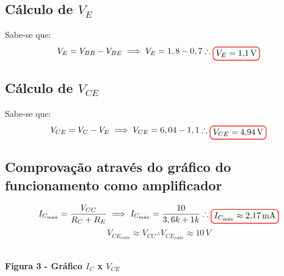 \documentclass[12pt,openany,oneside,a4paper]{abntex2}
\begin{document}
\subsection{Cálculo de $V_{E}$}
Sabe-se que:
\[
V_{E} = V_{BB} - V_{BE} \implies V_{E} = 1,8 - 0,7 \therefore \tikz[baseline]{\node[draw=red, thick, rounded corners] {$V_{E} = 1{,}1\,\text{V}$};}
\]

\subsection{Cálculo de $V_{CE}$}
Sabe-se que:
\[
V_{CE} = V_{C} - V_{E} \implies V_{CE} = 6,04 - 1,1 \therefore \tikz[baseline]{\node[draw=red, thick, rounded corners] {$V_{CE} = 4{,}94\,\text{V}$};}
\]

\subsection{Comprovação através do gráfico do funcionamento como amplificador}
\[
I_{C_{\text{máx}}} = \frac {V_{CC}}{R_{C} + R_{E}} \implies I_{C_{\text{máx}}} = \frac {10}{3,6k + 1k} \therefore \tikz[baseline]{\node[draw=red, thick, rounded corners] {$I_{C_{\text{máx}}} \approx 2{,}17\,\text{mA}$};}
\]
\[
V_{CE_{\text{corte}}} \approx V_{CC} \therefore V_{CE_{\text{corte}}} \approx 10\,V
\]

\begin{center}

    \\  %

    \large \textbf{Figura 3 - Gráfico $I_C$ x $V_{CE}$}
\end{center}
\end{document}
